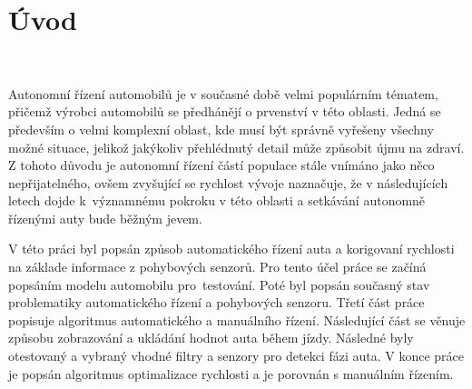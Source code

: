 \chapter*{Úvod}
\label{sec:Introduction}
\

Autonomní řízení automobilů je v současné době velmi populárním tématem, 
přičemž výrobci automobilů se předhánějí o prvenství v této oblasti. 
Jedná se především o velmi komplexní oblast, kde musí být správně 
vyřešeny všechny možné situace, jelikož jakýkoliv přehlédnutý detail může
způsobit újmu na zdraví. Z tohoto důvodu je autonomní řízení částí 
populace stále vnímáno jako něco  nepřijatelného, ovšem zvyšující se 
rychlost vývoje naznačuje, že v následujících letech dojde k~významnému 
pokroku v této oblasti a setkávání autonomně řízenými auty bude běžným 
jevem.

V této práci byl popsán způsob automatického řízení auta a korigovaní 
rychlosti na základe informace z pohybových senzorů. Pro tento účel 
práce se začíná popsáním modelu automobilu pro~testování. Poté byl
popsán současný stav problematiky automatického řízení a pohybových 
senzoru. Třetí část práce popisuje algoritmus automatického a manuálního 
řízení. Následující část se věnuje způsobu zobrazování a ukládání hodnot 
auta během jízdy. Následné byly otestovaný a vybraný vhodné filtry a 
senzory pro detekci fázi auta. V konce práce je popsán algoritmus 
optimalizace rychlosti a je porovnán s manuálním řízením.

\endinput

